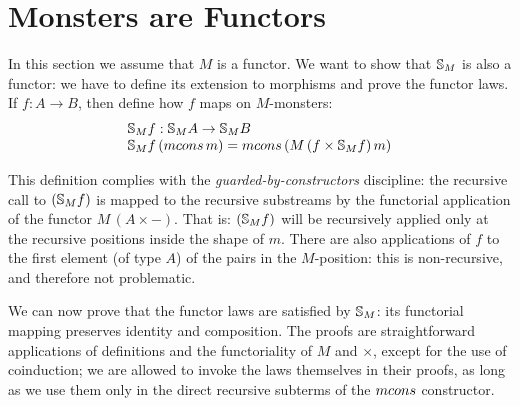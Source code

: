 \section{Monsters are Functors}\label{sec:functor}

In this section we assume that $M$ is a functor.
We want to show that $\mathbb{S}_{M}$ is also a functor: we have to define its extension to morphisms and prove the functor laws.
If $f:A\rightarrow B$, then define how $f$ maps on $M$-monsters:
$$
\begin{array}{l}
\stream{M} f : \stream{M} A \rightarrow \stream{M} B\\
\stream{M} f\,(\mcons\,m) = \mcons\,(M\,(f\times \stream{M} f)\,m)
\end{array}
$$

This definition complies with the {\em guarded-by-constructors} discipline: the recursive call to $(\mathbb{S}_{M} f)$ is mapped to the recursive substreams by the functorial application of the functor $M\,(A \times -)$.
That is: $(\mathbb{S}_{M} f)$ will be recursively applied only at the recursive positions inside the shape of $m$.
There are also applications of $f$ to the first element (of type $A$) of the pairs in the $M$-position: this is non-recursive, and therefore not problematic.


We can now prove that the functor laws are satisfied by $\mathbb{S}_{M}$: its functorial mapping preserves identity and composition.
The proofs are straightforward applications of definitions and the functoriality of $M$ and $\times$, except for the use of coinduction;
we are allowed to invoke the laws themselves in their proofs, as long as we use them only in the direct recursive subterms of the $\mcons$ constructor.

